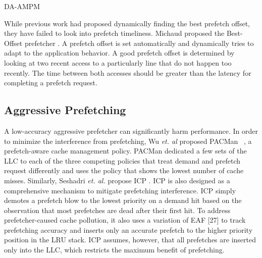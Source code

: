 DA-AMPM


While previous work had proposed dynamically finding the best prefetch offset, they have failed to look into prefetch timeliness. Michaud proposed the Best-Offset prefetcher \cite{BOP}. A prefetch offset is set automatically and dynamically tries to adapt to the application behavior. A good prefetch offset is determined by looking at two recent access to a particularly line that do not happen too recently. The time between both accesses should be greater than the latency for completing a prefetch request. 

\subsection{Aggressive Prefetching}


A low-accuracy aggressive prefetcher can significantly harm performance. In order to minimize the interference from prefetching, Wu \textit{et. al} proposed PACMan ~\cite{pacman}, a prefetch-aware cache management policy. PACMan dedicated a few sets of the LLC to each of the three competing policies that treat demand and prefetch request differently and uses the policy that shows the lowest number of cache misses. Similarly, Seshadri  \textit{et. al.} propose ICP \cite{icp}. ICP is also designed as a comprehensive mechanism to mitigate prefetching interference. ICP simply demotes a prefetch blow to the lowest priority on a demand hit based on the observation that most prefetches are dead after their first hit. To address prefetcher-caused cache pollution, it also uses a variation of EAF [27] to track prefetching accuracy and inserts only an accurate prefetch to the higher priority position in the LRU stack. ICP assumes, however, that all prefetches are inserted only into the LLC, which restricts the maximum benefit of prefetching.
